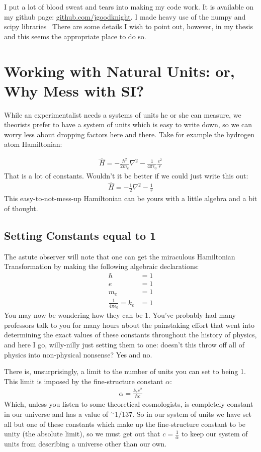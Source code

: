 I put a lot of blood sweat and tears into making my code work.  It is available on my github page: \url{github.com/jgoodknight}.  I made heavy use of the numpy and scipy libraries~\cite{scipy,numpy}  There are some details I wish to point out, however, in my thesis and this seems the appropriate place to do so.

\section{Working with Natural Units: or, Why Mess with SI?}

While an experimentalist needs a systems of units he or she can measure, we theorists prefer to have a system of units which is easy to write down, so we can worry less about dropping factors here and there.  Take for example the hydrogen atom Hamiltonian:

\begin{align*}
	\hat{H} = -\frac{\hbar ^2}{2 m_e} \nabla^2 - \frac{1}{4 \pi \epsilon_0} \frac{e^2}{r}
\end{align*}
That is a lot of constants.  Wouldn't it be better if we could just write this out:
\begin{align*}
	\hat{H} = -\frac{1}{2 } \nabla^2 -  \frac{1}{r}
\end{align*}
This easy-to-not-mess-up Hamiltonian can be yours with a little algebra and a bit of thought.

\subsection{Setting Constants equal to 1}
The astute observer will note that one can get the miraculous Hamiltonian Transformation by making the following algebraic declarations:
\begin{align*}
	\hbar &= 1 \\
	e &= 1 \\
	m_e &= 1 \\
	\frac{1}{4 \pi \epsilon_0} = k_e &= 1
\end{align*}
You may now be wondering how they can be 1.  You've probably had many professors talk to you for many hours about the painstaking effort that went into determining the exact values of these constants throughout the history of physics, and here I go, willy-nilly just setting them to one: doesn't this throw off all of physics into non-physical nonsense?  Yes and no.

There is, unsurprisingly, a limit to the number of units you can set to being 1.  This limit is imposed by the fine-structure constant $\alpha$:
\begin{align*}
	\alpha = \frac{k_e e^2}{\hbar c}
\end{align*}
Which, unless you listen to some theoretical cosmologists, is completely constant in our universe and has a value of $^\sim 1/137$.  So in our system of units we have set all but one of these constants which make up the fine-structure constant to be unity (the absolute limit), so we must get out that $c = \frac{1}{\alpha}$ to keep our system of units from describing a universe other than our own.


